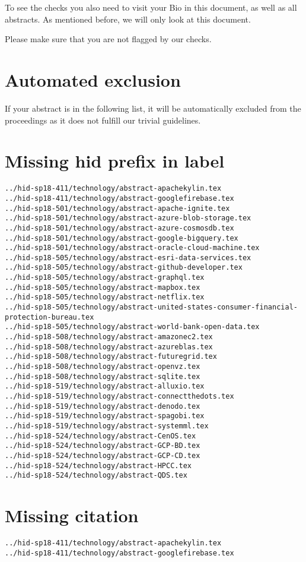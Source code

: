 To see the checks you also need to visit your Bio in this document, as
well as all abstracts. As mentioned before, we will only look at this
document.

Please make sure that you are not flagged by our checks. 

\section{Automated exclusion}

If your abstract is in the following list, it will be automatically
excluded from the proceedings as it does not fulfill our trivial
guidelines.

\section{Missing hid prefix in label}
\begin{verbatim}
../hid-sp18-411/technology/abstract-apachekylin.tex
../hid-sp18-411/technology/abstract-googlefirebase.tex
../hid-sp18-501/technology/abstract-apache-ignite.tex
../hid-sp18-501/technology/abstract-azure-blob-storage.tex
../hid-sp18-501/technology/abstract-azure-cosmosdb.tex
../hid-sp18-501/technology/abstract-google-bigquery.tex
../hid-sp18-501/technology/abstract-oracle-cloud-machine.tex
../hid-sp18-505/technology/abstract-esri-data-services.tex
../hid-sp18-505/technology/abstract-github-developer.tex
../hid-sp18-505/technology/abstract-graphql.tex
../hid-sp18-505/technology/abstract-mapbox.tex
../hid-sp18-505/technology/abstract-netflix.tex
../hid-sp18-505/technology/abstract-united-states-consumer-financial-protection-bureau.tex
../hid-sp18-505/technology/abstract-world-bank-open-data.tex
../hid-sp18-508/technology/abstract-amazonec2.tex
../hid-sp18-508/technology/abstract-azureblas.tex
../hid-sp18-508/technology/abstract-futuregrid.tex
../hid-sp18-508/technology/abstract-openvz.tex
../hid-sp18-508/technology/abstract-sqlite.tex
../hid-sp18-519/technology/abstract-alluxio.tex
../hid-sp18-519/technology/abstract-connectthedots.tex
../hid-sp18-519/technology/abstract-denodo.tex
../hid-sp18-519/technology/abstract-spagobi.tex
../hid-sp18-519/technology/abstract-systemml.tex
../hid-sp18-524/technology/abstract-CenOS.tex
../hid-sp18-524/technology/abstract-GCP-BD.tex
../hid-sp18-524/technology/abstract-GCP-CD.tex
../hid-sp18-524/technology/abstract-HPCC.tex
../hid-sp18-524/technology/abstract-QDS.tex

\end{verbatim}
\section{Missing citation}
\begin{verbatim}
../hid-sp18-411/technology/abstract-apachekylin.tex
../hid-sp18-411/technology/abstract-googlefirebase.tex

\end{verbatim}

